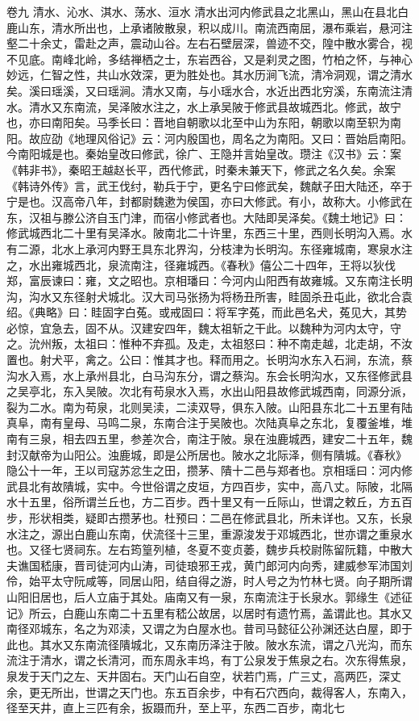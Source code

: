 \documentclass[12pt,UTF8]{ctexbook}
\begin{document}
卷九 清水、沁水、淇水、荡水、洹水 
清水出河内修武县之北黑山，黑山在县北白鹿山东，清水所出也，上承诸陂散泉，积以成川。南流西南屈，瀑布乘岩，悬河注壑二十余丈，雷赴之声，震动山谷。左右石壁层深，兽迹不交，隍中散水雾合，视不见底。南峰北岭，多结禅栖之士，东岩西谷，又是刹灵之图，竹柏之怀，与神心妙远，仁智之性，共山水效深，更为胜处也。其水历涧飞流，清冷洞观，谓之清水矣。溪曰瑶溪，又曰瑶涧。清水又南，与小瑶水合，水近出西北穷溪，东南流注清水。清水又东南流，吴泽陂水注之，水上承吴陂于修武县故城西北。修武，故宁也，亦曰南阳矣。马季长曰：晋地自朝歌以北至中山为东阳，朝歌以南至轵为南阳。故应劭《地理风俗记》云：河内殷国也，周名之为南阳。又曰：晋始启南阳。今南阳城是也。秦始皇改曰修武，徐广、王隐并言始皇改。瓒注《汉书》云：案《韩非书》，秦昭王越赵长平，西代修武，时秦未兼天下，修武之名久矣。余案《韩诗外传》言，武王伐纣，勒兵于宁，更名宁曰修武矣，魏献子田大陆还，卒于宁是也。汉高帝八年，封都尉魏遬为侯国，亦曰大修武。有小，故称大。小修武在东，汉祖与滕公济自玉门津，而宿小修武者也。大陆即吴泽矣。《魏土地记》曰：修武城西北二十里有吴泽水。陂南北二十许里，东西三十里，西则长明沟入焉。水有二源，北水上承河内野王具东北界沟，分枝津为长明沟。东径雍城南，寒泉水注之，水出雍城西北，泉流南注，径雍城西。《春秋》僖公二十四年，王将以狄伐郑，富辰谏曰：雍，文之昭也。京相璠曰：今河内山阳西有故雍城。又东南注长明沟，沟水又东径射犬城北。汉大司马张扬为将杨丑所害，眭固杀丑屯此，欲北合袁绍。《典略》曰：眭固字白菟。或戒固曰：将军字菟，而此邑名犬，菟见大，其势必惊，宜急去，固不从。汉建安四年，魏太祖斩之干此。以魏种为河内太守，守之。沇州叛，太祖曰：惟种不弃孤。及走，太祖怒曰：种不南走越，北走胡，不汝置也。射犬平，禽之。公曰：惟其才也。释而用之。长明沟水东入石涧，东流，蔡沟水入焉，水上承州县北，白马沟东分，谓之蔡沟。东会长明沟水，又东径修武县之吴亭北，东入吴陂。次北有苟泉水入焉，水出山阳县故修武城西南，同源分派，裂为二水。南为苟泉，北则吴渎，二渎双导，俱东入陂。山阳县东北二十五里有陆真阜，南有皇母、马鸣二泉，东南合注于吴陂也。次陆真阜之东北，复覆釜堆，堆南有三泉，相去四五里，参差次合，南注于陂。泉在浊鹿城西，建安二十五年，魏封汉献帝为山阳公。浊鹿城，即是公所居也。陂水之北际泽，侧有隤城。《春秋》隐公十一年，王以司寇苏忿生之田，攒茅、隤十二邑与郑者也。京相瑶曰：河内修武县北有故隤城，实中。今世俗谓之皮垣，方四百步，实中，高八丈。际陂，北隔水十五里，俗所谓兰丘也，方二百步。西十里又有一丘际山，世谓之敕丘，方五百步，形状相类，疑即古攒茅也。杜预曰：二邑在修武县北，所未详也。又东，长泉水注之，源出白鹿山东南，伏流径十三里，重源浚发于邓城西北，世亦谓之重泉水也。又径七贤祠东。左右筠篁列植，冬夏不变贞萎，魏步兵校尉陈留阮籍，中散大夫谯国嵇康，晋司徒河内山涛，司徒琅邪王戎，黄门郎河内向秀，建威参军沛国刘伶，始平太守阮咸等，同居山阳，结自得之游，时人号之为竹林七贤。向子期所谓山阳旧居也，后人立庙于其处。庙南又有一泉，东南流注于长泉水。郭缘生《述征记》所云，白鹿山东南二十五里有嵇公故居，以居时有遗竹焉，盖谓此也。其水又南径邓城东，名之为邓渎，又谓之为白屋水也。昔司马懿征公孙渊还达白屋，即于此也。其水又东南流径隤城北，又东南历泽注于陂。陂水东流，谓之八光沟，而东流注于清水，谓之长清河，而东周永丰坞，有丁公泉发于焦泉之右。次东得焦泉，泉发于天门之左、天井固右。天门山石自空，状若门焉，广三丈，高两匹，深丈余，更无所出，世谓之天门也。东五百余步，中有石穴西向，裁得客人，东南入，径至天井，直上三匹有余，扳蹑而升，至上平，东西二百步，南北七
\end{document}
